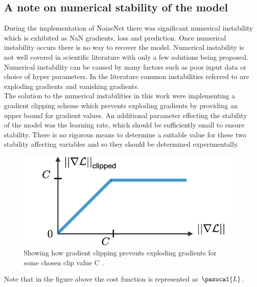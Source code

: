 \documentclass{article}
\begin{document}
\subsection{A note on numerical stability of the model}
During the implementation of NoizeNet there was significant numerical instability which is exhibited as NaN gradients, loss and prediction. Once numerical instability occurs there is no way to recover the model. Numerical instability is not well covered in scientific literature with only a few solutions being proposed. Numerical instability can be caused by many factors such as poor input data or choice of hyper parameters. In the literature common instabilities referred to are exploding gradients and vanishing gradients. \\
The solution to the numerical instabilities in this work were implementing a gradient clipping scheme which prevents exploding gradients by providing an upper bound for gradient values. An additional parameter effecting the stability of the model was the learning rate, which should be sufficiently small to ensure stability. There is no rigorous means to determine a suitable value for these two stability affecting variables and so they should be determined experimentally. 
\begin{figure}[H]
\caption{Showing how gradient clipping prevents exploding gradients for some chosen clip value C \cite{stanford}. }
\includegraphics[scale=0.35]{gradient_clipping.png}
\end{figure}
Note that in the figure above the cost function is represented as $\pazocal{L}$.
\end{document}
